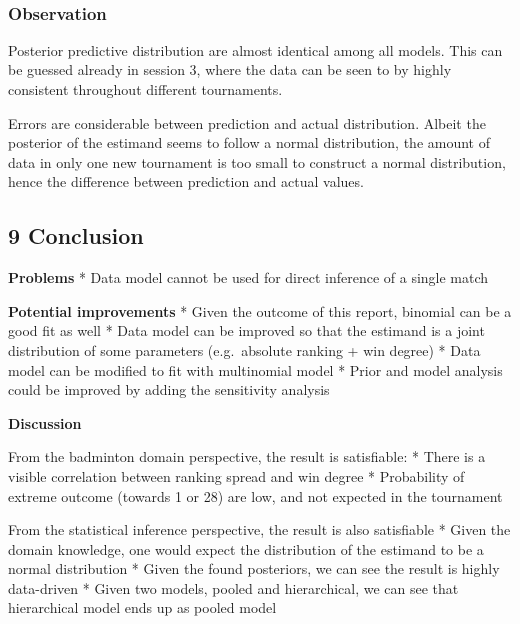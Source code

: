 \documentclass[11pt]{article}
\begin{document}
    \begin{center}
    \end{center}
    { \hspace*{\fill} \\}
    
    \hypertarget{observation}{%
\subsubsection{Observation}\label{observation}}

Posterior predictive distribution are almost identical among all models.
This can be guessed already in session 3, where the data can be seen to
by highly consistent throughout different tournaments.

Errors are considerable between prediction and actual distribution.
Albeit the posterior of the estimand seems to follow a normal
distribution, the amount of data in only one new tournament is too small
to construct a normal distribution, hence the difference between
prediction and actual values.

    \hypertarget{conclusion}{%
\subsection{9 Conclusion}\label{conclusion}}

\textbf{Problems} * Data model cannot be used for direct inference of a
single match

\textbf{Potential improvements} * Given the outcome of this report,
binomial can be a good fit as well * Data model can be improved so that
the estimand is a joint distribution of some parameters (e.g.~absolute
ranking + win degree) * Data model can be modified to fit with
multinomial model * Prior and model analysis could be improved by adding
the sensitivity analysis

\textbf{Discussion}

From the badminton domain perspective, the result is satisfiable: *
There is a visible correlation between ranking spread and win degree *
Probability of extreme outcome (towards 1 or 28) are low, and not
expected in the tournament

From the statistical inference perspective, the result is also
satisfiable * Given the domain knowledge, one would expect the
distribution of the estimand to be a normal distribution * Given the
found posteriors, we can see the result is highly data-driven * Given
two models, pooled and hierarchical, we can see that hierarchical model
ends up as pooled model
\end{document}
